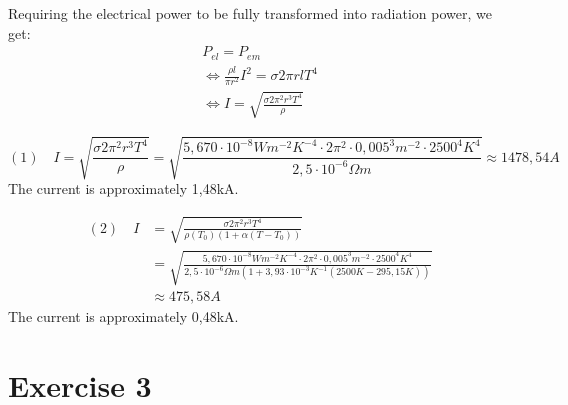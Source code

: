 \documentclass[a4paper,german,12pt]{scrartcl}
\begin{document}
\begin{enumerate}[(a)]
Requiring the electrical power to be fully transformed into radiation power, we get:
\begin{align*}
P_{el}=P_{em}\\
\Leftrightarrow \frac{\rho l}{\pi r^2}I^2=\sigma 2\pi rl T^4\\
\Leftrightarrow I=\sqrt{\frac{\sigma 2\pi^2 r^3 T^4}{\rho}}
\end{align*}

\begin{equation*}
(1)\quad I=\sqrt{\frac{\sigma 2\pi^2 r^3 T^4}{\rho}}=\sqrt{\frac{5,670\cdot 10^{-8}Wm^{-2}K^{-4}\cdot2\pi^2\cdot0,005^3m^{-2}\cdot2500^4K^4}{2,5\cdot 10^{-6}\Omega m}}\approx 1478,54A
\end{equation*}
The current is approximately 1,48kA.

\begin{align*}
(2)\quad I&=\sqrt{\frac{\sigma 2\pi^2 r^3 T^4}{\rho(T_0)(1+\alpha(T-T_0))}}\\
&=\sqrt{\frac{5,670\cdot 10^{-8}Wm^{-2}K^{-4}\cdot2\pi^2\cdot0,005^3m^{-2}\cdot2500^4K^4}{2,5\cdot 10^{-6}\Omega m(1+3,93\cdot10^{-3}K^{-1}(2500K-295,15K))}}\\
&\approx 475,58A
\end{align*}
The current is approximately 0,48kA.

\end{enumerate}


\section*{Exercise 3}
\end{document}
